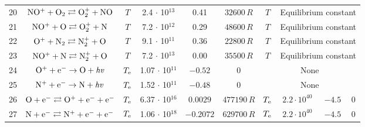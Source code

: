 \documentclass{warpdoc}
\begin{document}
\begin{table}[t]
\begin{center}
\begin{threeparttable}
\begin{tabular}{cccccccccc}
20 & $\rm NO^+ + O_2 \rightleftarrows O_2^+ + NO $ & $T$   & 2.4 $\cdot$ 10$^{13}$  & 0.41 & $32600 \, R$ & $T$ & \multicolumn{3}{c}{Equilibrium constant}\\

21 & $\rm NO^+ + O \rightleftarrows O_2^+ + N $ & $T$   & 7.2 $\cdot$ 10$^{12}$  & 0.29 & $48600 \, R$ & $T$ & \multicolumn{3}{c}{Equilibrium constant}\\

22 & $\rm O^+ + N_2 \rightleftarrows N_2^+ + O $ & $T$  & 9.1 $\cdot$ 10$^{11}$  & 0.36 & $22800 \, R$ & $T$  & \multicolumn{3}{c}{Equilibrium constant}\\

23 & $\rm NO^+ + N \rightleftarrows N_2^+ + O $  & $T$  & 7.2 $\cdot$ 10$^{13}$  & 0.00 & $35500 \, R$ & $T$ & \multicolumn{3}{c}{Equilibrium constant}\\



24 & $\rm O^+ + e^- \rightarrow O + {\it hv} $ & $T_{\rm e}$  & 1.07 $\cdot$ 10$^{11}$  & $-0.52$ & $0$ &  \multicolumn{4}{c}{None}\\
25 & $\rm N^+ + e^- \rightarrow N + {\it hv} $ & $T_{\rm e}$  & 1.52 $\cdot$ 10$^{11}$  & $-0.48$ & $0$ &  \multicolumn{4}{c}{None}\\


26 & $\rm O + e^- \rightleftarrows O^+ + e^- + e^- $ & $T_{\rm e}$  & 6.37 $\cdot$ 10$^{16}$  & $0.0029$ & $477190 \, R$ & $T_{\rm e}$ & $2.2\cdot 10^{40}$ & $-4.5$ & 0\\

27 & $\rm N + e^- \rightleftarrows N^+ + e^- + e^- $ & $T_{\rm e}$  & 1.06 $\cdot$ 10$^{18}$  & $-0.2072$ & $629700 \, R$ & $T_{\rm e}$ & $2.2\cdot 10^{40}$ & $-4.5$ & 0\\


\end{tabular}
\end{threeparttable}
\end{center}
\end{table}
\end{document}
